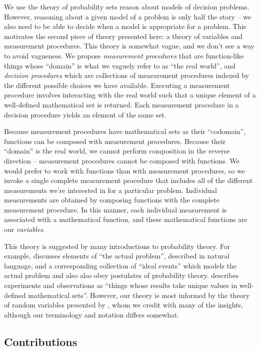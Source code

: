 \documentclass{article}
\theoremstyle{plain}
\theoremstyle{definition}
\begin{document}
We use the theory of probability sets reason about models of decision problems. However, reasoning about a given model of a problem is only half the story -- we also need to be able to decide when a model is appropriate for a problem. This motivates the second piece of theory presented here: a theory of variables and measurement procedures. This theory is somewhat vague, and we don't see a way to avoid vagueness. We propose \emph{measurement procedures} that are function-like things whose ``domain'' is what we vaguely refer to as ``the real world'', and \emph{decision procedures} which are collections of measurement procedures indexed by the different possible choices we have available. Executing a measurement procedure involves interacting with the real world such that a unique element of a well-defined mathematical set is returned. Each measurement procedure in a decision procedure yields an element of the same set. 

Because measurement procedures have mathematical sets as their ``codomain'', functions can be composed with measurement procedures. Because their ``domain'' is the real world, we cannot perform composition in the reverse direction -- measurement procedures cannot be composed with functions. We would prefer to work with functions than with measurement procedures, so we invoke a single complete measurement procedure that includes all of the different measurements we're interested in for a particular problem. Individual measurements are obtained by composing functions with the complete measurement procedure. In this manner, each individual measurement is associated with a mathematical function, and these mathematical functions are our \emph{variables}.

This theory is suggested by many introductions to probability theory. For example, \citet{boole_theory_1862} discusses elements of ``the actual problem'', described in natural language, and a corresponding collection of ``ideal events'' which models the actual problem and also also obey postulates of probability theory. \citet{feller_introduction_1968} describes experiments and observations as ``things whose results take unique values in well-defined mathematical sets''. However, our theory is most informed by the theory of random variables presented by \citet{menger_random_2003}, whom we credit with many of the insights, although our terminology and notation differs somewhat.

\subsection{Contributions}
\end{document}
